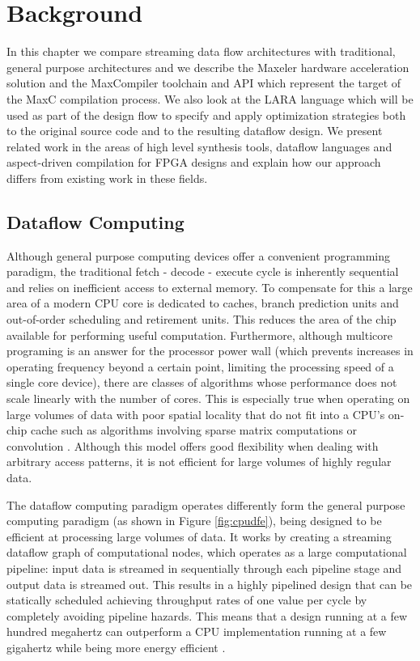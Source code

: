 \chapter{Background}

In this chapter we compare streaming data flow architectures with
traditional, general purpose architectures and we describe the Maxeler
hardware acceleration solution and the MaxCompiler toolchain and API
which represent the target of the MaxC compilation process. We also
look at the LARA language which will be used as part of the design
flow to specify and apply optimization strategies both to the original
source code and to the resulting dataflow design. We present related
work in the areas of high level synthesis tools, dataflow languages
and aspect-driven compilation for FPGA designs and explain how our
approach differs from existing work in these fields.

\section{Dataflow Computing}

Although general purpose computing devices offer a convenient
programming paradigm, the traditional fetch - decode - execute cycle
is inherently sequential and relies on inefficient access to external
memory. To compensate for this a large area of a modern CPU core is
dedicated to caches, branch prediction units and out-of-order
scheduling and retirement units. This reduces the area of the chip
available for performing useful computation. Furthermore, although
multicore programing is an answer for the processor power wall (which
prevents increases in operating frequency beyond a certain point,
limiting the processing speed of a single core device), there are
classes of algorithms whose performance does not scale linearly with
the number of cores. This is especially true when operating on large
volumes of data with poor spatial locality that do not fit into a
CPU's on-chip cache such as algorithms involving sparse matrix
computations or convolution
\cite{Lindjtorn:Clapp:Pell:Mencer:Flynn:2010}. Although this model
offers good flexibility when dealing with arbitrary access patterns,
it is not efficient for large volumes of highly regular data.

The dataflow computing paradigm operates differently form the general
purpose computing paradigm (as shown in Figure \ref{fig:cpudfe}),
being designed to be efficient at processing large volumes of data. It
works by creating a streaming dataflow graph of computational nodes,
which operates as a large computational pipeline: input data is
streamed in sequentially through each pipeline stage and output data
is streamed out. This results in a highly pipelined design that can be
statically scheduled achieving throughput rates of one value per cycle
by completely avoiding pipeline hazards. This means that a design
running at a few hundred megahertz can outperform a CPU implementation
running at a few gigahertz while being more energy efficient
\cite{Pell:Mencer:2011}.



